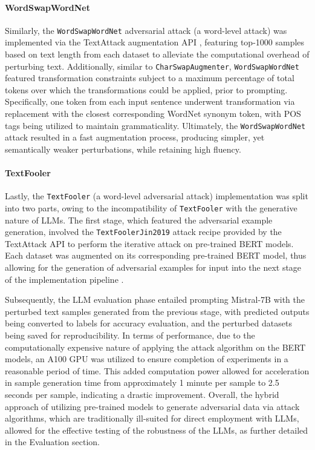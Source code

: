 \documentclass[conference]{IEEEtran}
\begin{document}
\paragraph{WordSwapWordNet}
Similarly, the \texttt{WordSwapWordNet} adversarial attack (a word-level attack) was implemented via the TextAttack augmentation API \cite{textattack2020framework}, featuring top-1000 samples based on text length from each dataset to alleviate the computational overhead of perturbing text. Additionally, similar to \texttt{CharSwapAugmenter}, \texttt{WordSwapWordNet} featured transformation constraints subject to a maximum percentage of total tokens over which the transformations could be applied, prior to prompting. Specifically, one token from each input sentence underwent transformation via replacement with the closest corresponding WordNet synonym token, with POS tags being utilized to maintain grammaticality. Ultimately, the \texttt{WordSwapWordNet} attack resulted in a fast augmentation process, producing simpler, yet semantically weaker perturbations, while retaining high fluency.

\paragraph{TextFooler}
Lastly, the \texttt{TextFooler} (a word-level adversarial attack) implementation was split into two parts, owing to the incompatibility of \texttt{TextFooler} with the generative nature of LLMs. The first stage, which featured the adversarial example generation, involved the \texttt{TextFoolerJin2019} attack recipe provided by the TextAttack API \cite{textattack2020framework} to perform the iterative attack on pre-trained BERT models. Each dataset was augmented on its corresponding pre-trained BERT model, thus allowing for the generation of adversarial examples for input into the next stage of the implementation pipeline \cite{jin2020bertrobust}.

Subsequently, the LLM evaluation phase entailed prompting Mistral-7B with the perturbed text samples generated from the previous stage, with predicted outputs being converted to labels for accuracy evaluation, and the perturbed datasets being saved for reproducibility. In terms of performance, due to the computationally expensive nature of applying the attack algorithm on the BERT models, an A100 GPU was utilized to ensure completion of experiments in a reasonable period of time. This added computation power allowed for acceleration in sample generation time from approximately 1 minute per sample to 2.5 seconds per sample, indicating a drastic improvement. Overall, the hybrid approach of utilizing pre-trained models to generate adversarial data via attack algorithms, which are traditionally ill-suited for direct employment with LLMs, allowed for the effective testing of the robustness of the LLMs, as further detailed in the Evaluation section.
\end{document}
